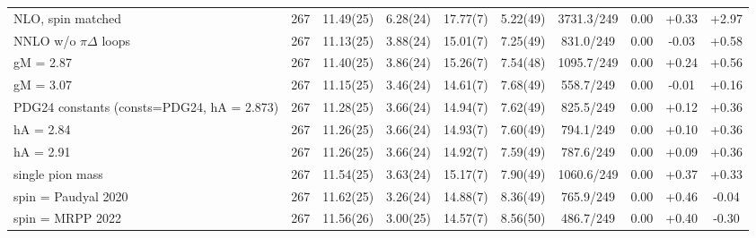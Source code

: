 \begin{tabular}{lccccccccc}
NLO, spin matched & 267 & 11.49(25) & 6.28(24) & 17.77(7) & 5.22(49) & 3731.3/249 & 0.00 & +0.33 & +2.97 \\
NNLO w/o $\pi\Delta$ loops & 267 & 11.13(25) & 3.88(24) & 15.01(7) & 7.25(49) & 831.0/249 & 0.00 & -0.03 & +0.58 \\
gM = 2.87 & 267 & 11.40(25) & 3.86(24) & 15.26(7) & 7.54(48) & 1095.7/249 & 0.00 & +0.24 & +0.56 \\
gM = 3.07 & 267 & 11.15(25) & 3.46(24) & 14.61(7) & 7.68(49) & 558.7/249 & 0.00 & -0.01 & +0.16 \\
PDG24 constants (consts=PDG24, hA = 2.873) & 267 & 11.28(25) & 3.66(24) & 14.94(7) & 7.62(49) & 825.5/249 & 0.00 & +0.12 & +0.36 \\
hA = 2.84 & 267 & 11.26(25) & 3.66(24) & 14.93(7) & 7.60(49) & 794.1/249 & 0.00 & +0.10 & +0.36 \\
hA = 2.91 & 267 & 11.26(25) & 3.66(24) & 14.92(7) & 7.59(49) & 787.6/249 & 0.00 & +0.09 & +0.36 \\
single pion mass & 267 & 11.54(25) & 3.63(24) & 15.17(7) & 7.90(49) & 1060.6/249 & 0.00 & +0.37 & +0.33 \\
spin = Paudyal 2020 & 267 & 11.62(25) & 3.26(24) & 14.88(7) & 8.36(49) & 765.9/249 & 0.00 & +0.46 & -0.04 \\
spin = MRPP 2022 & 267 & 11.56(26) & 3.00(25) & 14.57(7) & 8.56(50) & 486.7/249 & 0.00 & +0.40 & -0.30 \\
\hline
\end{tabular}

